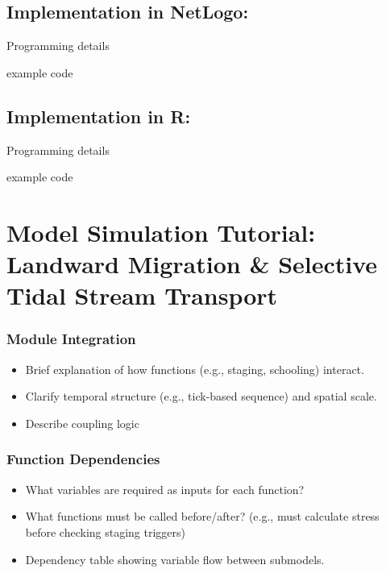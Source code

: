 \documentclass[
]{book}
\providecommand{\tightlist}{%
  \setlength{\itemsep}{0pt}\setlength{\parskip}{0pt}}
\begin{document}
\section{Implementation in NetLogo:}\label{implementation-in-netlogo}

Programming details

example code

\section{Implementation in R:}\label{implementation-in-r}

Programming details

example code

\chapter{Model Simulation Tutorial: Landward Migration \& Selective Tidal Stream Transport}\label{model-simulation-tutorial-landward-migration-selective-tidal-stream-transport}

\subsection{Module Integration}\label{module-integration-1}

\begin{itemize}
\tightlist
\item
  Brief explanation of how functions (e.g., staging, schooling) interact.
\item
  Clarify temporal structure (e.g., tick-based sequence) and spatial scale.
\item
  Describe coupling logic
\end{itemize}

\subsection{\texorpdfstring{\textbf{Function Dependencies}}{Function Dependencies}}\label{function-dependencies-1}

\begin{itemize}
\item
  What variables are required as inputs for each function?
\item
  What functions must be called before/after? (e.g., must calculate stress before checking staging triggers)
\item
  Dependency table showing variable flow between submodels.
\end{itemize}
\end{document}
